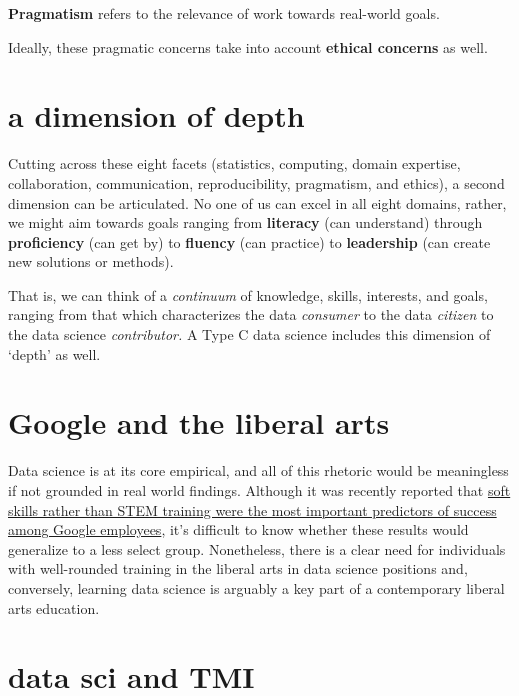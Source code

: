 \documentclass[openany]{book}
\begin{document}
\textbf{Pragmatism} refers to the relevance of work towards real-world goals.

Ideally, these pragmatic concerns take into account \textbf{ethical concerns} as well.

\hypertarget{a-dimension-of-depth}{%
\section{a dimension of depth}\label{a-dimension-of-depth}}

Cutting across these eight facets (statistics, computing, domain expertise, collaboration, communication, reproducibility, pragmatism, and ethics), a second dimension can be articulated. No one of us can excel in all eight domains, rather, we might aim towards goals ranging from \textbf{literacy} (can understand) through \textbf{proficiency} (can get by) to \textbf{fluency} (can practice) to \textbf{leadership} (can create new solutions or methods).

That is, we can think of a \emph{continuum} of knowledge, skills, interests, and goals, ranging from that which characterizes the data \emph{consumer} to the data \emph{citizen} to the data science \emph{contributor.} A Type C data science includes this dimension of `depth' as well.

\hypertarget{google-and-the-liberal-arts}{%
\section{Google and the liberal arts}\label{google-and-the-liberal-arts}}

Data science is at its core empirical, and all of this rhetoric would be meaningless if not grounded in real world findings. Although it was recently reported that \href{https://www.washingtonpost.com/news/answer-sheet/wp/2017/12/20/the-surprising-thing-google-learned-about-its-employees-and-what-it-means-for-todays-students/?sw_bypass=true\&utm_term=.23e48235d66e}{soft skills rather than STEM training were the most important predictors of success among Google employees}, it's difficult to know whether these results would generalize to a less select group. Nonetheless, there is a clear need for individuals with well-rounded training in the liberal arts in data science positions and, conversely, learning data science is arguably a key part of a contemporary liberal arts education.

\hypertarget{data-sci-and-tmi}{%
\section{data sci and TMI}\label{data-sci-and-tmi}}
\end{document}
